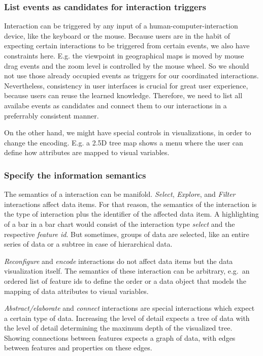\documentclass{article}
\newcommand{\tmap}{\textsc{2.5D} tree map}
\begin{document}
\subsubsection{List events as candidates for interaction triggers}

Interaction can be triggered by any input of a human-computer-interaction device, like the keyboard or the mouse.
Because users are in the habit of expecting certain interactions to be triggered from certain events, we also have constraints here.
E.g. the viewpoint in geographical maps is moved by mouse drag events and the zoom level is controlled by the mouse wheel.
So we should not use those already occupied events as triggers for our coordinated interactions.
Nevertheless, consistency in user interfaces is crucial for great user experience, because users can reuse the learned knowledge.
Therefore, we need to list all availabe events as candidates and connect them to our interactions in a preferrably consistent manner.

On the other hand, we might have special controls in visualizations, in order to change the encoding.
E.g. a \tmap{} shows a menu where the user can define how attributes are mapped to visual variables.

\subsubsection{Specify the information semantics}

The semantics of a interaction can be manifold.
\emph{Select}, \emph{Explore}, and \emph{Filter} interactions affect data items.
For that reason, the semantics of the interaction is the type of interaction plus the identifier of the affected data item.
A highlighting of a bar in a bar chart would consist of the interaction type \emph{select} and the respective \emph{feature id}.
But sometimes, groups of data are selected, like an entire series of data or a subtree in case of hierarchical data.

\emph{\emph{Reconfigure}} and \emph{encode} interactions do not affect data items but the data visualization itself.
The semantics of these interaction can be arbitrary, e.g.\ an ordered list of feature ids to define the order or a data object that models the mapping of data attributes to visual variables.

\emph{Abstract/elaborate} and \emph{connect} interactions are special interactions which expect a certain type of data.
Increasing the level of detail expects a tree of data with the level of detail determining the maximum depth of the visualized tree.
Showing connections between features expects a graph of data, with edges between features and properties on these edges.
\end{document}
